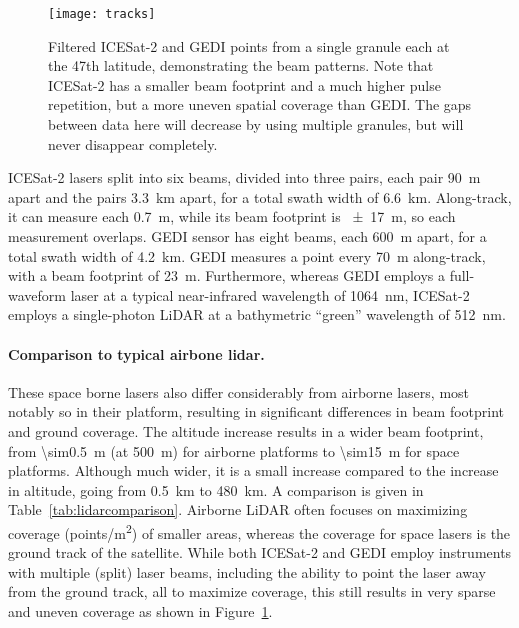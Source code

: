 %

\begin{figure}
  \centering
  \texttt{[image: tracks]}
  \caption{Filtered ICESat-2 and GEDI points from a single granule each at the 47th latitude, demonstrating the beam patterns.
    Note that ICESat-2 has a smaller beam footprint and a much higher pulse repetition, but a more uneven spatial coverage than GEDI\@.
    The gaps between data here will decrease by using multiple granules, but will never disappear completely.}%
  \label{fig:beams}
\end{figure}

ICESat-2 lasers split into six beams, divided into three pairs, each pair \qty{90}{m} apart and the pairs \qty{3.3}{km} apart, for a total swath width of \qty{6.6}{km}.
Along-track, it can measure each \qty{0.7}{m}, while its beam footprint is \qty{\pm17}{m}, so each measurement overlaps.
GEDI sensor has eight beams, each \qty{600}{m} apart, for a total swath width of \qty{4.2}{km}.
GEDI measures a point every \qty{70}{m} along-track, with a beam footprint of \qty{23}{m}.
Furthermore, whereas GEDI employs a full-waveform laser at a typical near-infrared wavelength of \qty{1064}{nm}, ICESat-2 employs a single-photon LiDAR at a bathymetric ``green'' wavelength of \qty{512}{nm}.

\paragraph{Comparison to typical airbone lidar.}
These space borne lasers also differ considerably from airborne lasers, most notably so in their platform, resulting in significant differences in beam footprint and ground coverage.
The altitude increase results in a wider beam footprint, from \qty{\sim0.5}{m} (at \qty{500}{m}) for airborne platforms to \qty{\sim15}{m} for space platforms.
Although much wider, it is a small increase compared to the increase in altitude, going from \qty{0.5}{km} to \qty{480}{km}.
A comparison is given in Table~\ref{tab:lidarcomparison}.
Airborne LiDAR often focuses on maximizing coverage (\unit{points/m^2}) of smaller areas, whereas the coverage for space lasers is the ground track of the satellite.
While both ICESat-2 and GEDI employ instruments with multiple (split) laser beams, including the ability to point the laser away from the ground track, all to maximize coverage, this still results in very sparse and uneven coverage as shown in Figure~\ref{fig:beams}.



